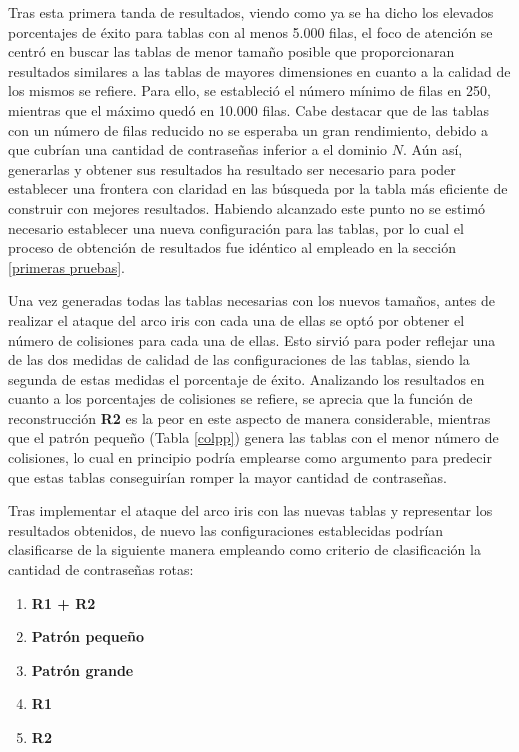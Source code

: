 \documentclass[12pt,spanish,listoffigures,listoftables]{tfgetsinf}
\begin{document}
Tras esta primera tanda de resultados, viendo como ya se ha dicho los elevados porcentajes de éxito para tablas con al menos 5.000 filas, el foco de atención se centró en buscar las tablas de menor tamaño posible que proporcionaran resultados similares a las tablas de mayores dimensiones en cuanto a la calidad de los mismos se refiere. Para ello, se estableció el número mínimo de filas en 250, mientras que el máximo quedó en 10.000 filas. Cabe destacar que de las tablas con un número de filas reducido no se esperaba un gran rendimiento, debido a que cubrían una cantidad de contraseñas inferior a el dominio $N$. Aún así, generarlas y obtener sus resultados ha resultado ser necesario para poder establecer una frontera con claridad en las búsqueda por la tabla más eficiente de construir con mejores resultados. Habiendo alcanzado este punto no se estimó necesario establecer una nueva configuración para las tablas, por lo cual el proceso de obtención de resultados fue idéntico al empleado en la sección \ref{primeras pruebas}.

Una vez generadas todas las tablas necesarias con los nuevos tamaños, antes de realizar el ataque del arco iris con cada una de ellas se optó por obtener el número de colisiones para cada una de ellas. Esto sirvió para poder reflejar una de las dos medidas de calidad de las configuraciones de las tablas, siendo la segunda de estas medidas el porcentaje de éxito. Analizando los resultados en cuanto a los porcentajes de colisiones se refiere, se aprecia que la función de reconstrucción \textbf{R2} es la peor en este aspecto de manera considerable, mientras que el patrón pequeño (Tabla \ref{colpp}) genera las tablas con el menor número de colisiones, lo cual en principio podría emplearse como argumento para predecir que estas tablas conseguirían romper la mayor cantidad de contraseñas.

Tras implementar el ataque del arco iris con las nuevas tablas y representar los resultados obtenidos, de nuevo las configuraciones establecidas podrían clasificarse de la siguiente manera empleando como criterio de clasificación la cantidad de contraseñas rotas:

\begin{enumerate}

    \item \textbf{R1 + R2}
    
    \item \textbf{Patrón pequeño}
    
    \item \textbf{Patrón grande}
    
    \item \textbf{R1}
    
    \item \textbf{R2}
    
\end{enumerate}
\end{document}
